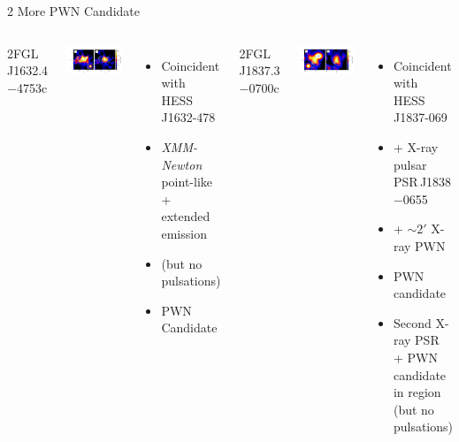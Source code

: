 \documentclass[12pt]{beamer}
\begin{document}
\begin{frame}{2 More PWN Candidate}


  \begin{columns}

2FGL\,J1632.4$-$4753c 

    \includegraphics[scale=0.3]{plots/source_HESS_J1632-478_color.pdf}

    \begin{itemize}
      \item Coincident with HESS\,J1632-478

      \item  {\em XMM-Newton} point-like + extended emission
      \item (but no pulsations)
      \item PWN Candidate
    \end{itemize}


    2FGL\,J1837.3$-$0700c 

    \includegraphics[scale=0.3]{plots/source_HESS_J1837-069_color.pdf}

    \begin{itemize}
      \item Coincident with HESS\,J1837-069
      \item + X-ray pulsar PSR\,J1838$-$0655 
      \item + $\sim 2'$ X-ray PWN 
      \item PWN candidate
      \item Second X-ray PSR + PWN candidate in region
        (but no pulsations)
    \end{itemize}
  \end{columns}
\end{frame}
\end{document}
